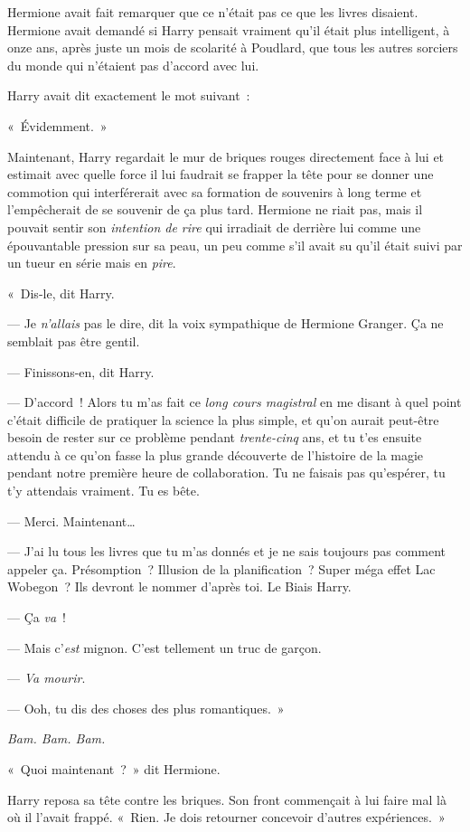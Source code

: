 Hermione avait fait remarquer que ce n'était pas ce que les livres disaient.
Hermione avait demandé si Harry pensait vraiment qu'il était plus intelligent, à onze ans, après juste un mois de scolarité à Poudlard, que tous les autres sorciers du monde qui n'étaient pas d'accord avec lui.

Harry avait dit exactement le mot suivant~:

«~Évidemment.~»

Maintenant, Harry regardait le mur de briques rouges directement face à lui et estimait avec quelle force il lui faudrait se frapper la tête pour se donner une commotion qui interférerait avec sa formation de souvenirs à long terme et l'empêcherait de se souvenir de ça plus tard.
Hermione ne riait pas, mais il pouvait sentir son \emph{intention de rire} qui irradiait de derrière lui comme une épouvantable pression sur sa peau, un peu comme s'il avait su qu'il était suivi par un tueur en série mais en \emph{pire}.

«~Dis-le, dit Harry.

--- Je \emph{n'allais} pas le dire, dit la voix sympathique de Hermione Granger.
Ça ne semblait pas être gentil.

--- Finissons-en, dit Harry.

--- D'accord~!
Alors tu m'as fait ce \emph{long cours magistral} en me disant à quel point c'était difficile de pratiquer la science la plus simple, et qu'on aurait peut-être besoin de rester sur ce problème pendant \emph{trente-cinq} ans, et tu t'es ensuite attendu à ce qu'on fasse la plus grande découverte de l'histoire de la magie pendant notre première heure de collaboration.
Tu ne faisais pas qu'espérer, tu t'y attendais vraiment.
Tu es bête.

--- Merci.
Maintenant…

--- J'ai lu tous les livres que tu m'as donnés et je ne sais toujours pas comment appeler ça.
Présomption~?
Illusion de la planification~?
Super méga effet Lac Wobegon~?
Ils devront le nommer d'après toi.
Le Biais Harry.

--- Ça \emph{va}~!

--- Mais c'\emph{est} mignon.
C'est tellement un truc de garçon.

--- \emph{Va mourir}.

--- Ooh, tu dis des choses des plus romantiques.~»

\emph{Bam.
Bam. Bam.}

«~Quoi maintenant~?~»
dit Hermione.

Harry reposa sa tête contre les briques.
Son front commençait à lui faire mal là où il l'avait frappé.
«~Rien. Je dois retourner concevoir d'autres expériences.~»

